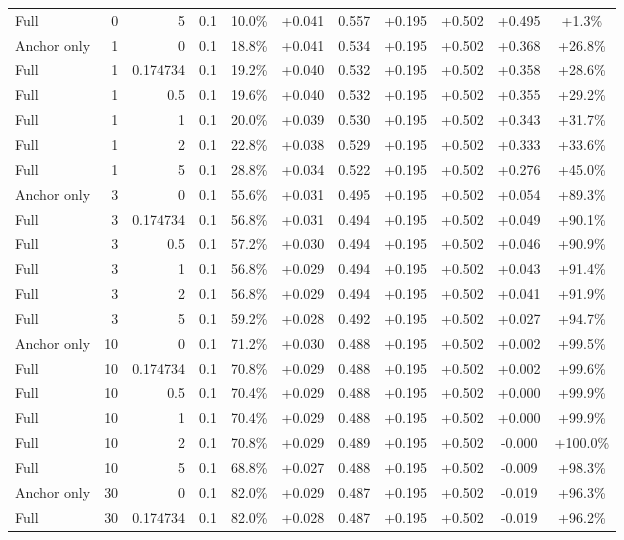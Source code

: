 \begin{table}[htbp]
\begin{tabular}{lrrrccccccc}
Full & 0 & 5 & 0.1 & 10.0\% & +0.041 & 0.557 & +0.195 & +0.502 & +0.495 & +1.3\% \\
Anchor only & 1 & 0 & 0.1 & 18.8\% & +0.041 & 0.534 & +0.195 & +0.502 & +0.368 & +26.8\% \\
Full & 1 & 0.174734 & 0.1 & 19.2\% & +0.040 & 0.532 & +0.195 & +0.502 & +0.358 & +28.6\% \\
Full & 1 & 0.5 & 0.1 & 19.6\% & +0.040 & 0.532 & +0.195 & +0.502 & +0.355 & +29.2\% \\
Full & 1 & 1 & 0.1 & 20.0\% & +0.039 & 0.530 & +0.195 & +0.502 & +0.343 & +31.7\% \\
Full & 1 & 2 & 0.1 & 22.8\% & +0.038 & 0.529 & +0.195 & +0.502 & +0.333 & +33.6\% \\
Full & 1 & 5 & 0.1 & 28.8\% & +0.034 & 0.522 & +0.195 & +0.502 & +0.276 & +45.0\% \\
Anchor only & 3 & 0 & 0.1 & 55.6\% & +0.031 & 0.495 & +0.195 & +0.502 & +0.054 & +89.3\% \\
Full & 3 & 0.174734 & 0.1 & 56.8\% & +0.031 & 0.494 & +0.195 & +0.502 & +0.049 & +90.1\% \\
Full & 3 & 0.5 & 0.1 & 57.2\% & +0.030 & 0.494 & +0.195 & +0.502 & +0.046 & +90.9\% \\
Full & 3 & 1 & 0.1 & 56.8\% & +0.029 & 0.494 & +0.195 & +0.502 & +0.043 & +91.4\% \\
Full & 3 & 2 & 0.1 & 56.8\% & +0.029 & 0.494 & +0.195 & +0.502 & +0.041 & +91.9\% \\
Full & 3 & 5 & 0.1 & 59.2\% & +0.028 & 0.492 & +0.195 & +0.502 & +0.027 & +94.7\% \\
Anchor only & 10 & 0 & 0.1 & 71.2\% & +0.030 & 0.488 & +0.195 & +0.502 & +0.002 & +99.5\% \\
Full & 10 & 0.174734 & 0.1 & 70.8\% & +0.029 & 0.488 & +0.195 & +0.502 & +0.002 & +99.6\% \\
Full & 10 & 0.5 & 0.1 & 70.4\% & +0.029 & 0.488 & +0.195 & +0.502 & +0.000 & +99.9\% \\
Full & 10 & 1 & 0.1 & 70.4\% & +0.029 & 0.488 & +0.195 & +0.502 & +0.000 & +99.9\% \\
Full & 10 & 2 & 0.1 & 70.8\% & +0.029 & 0.489 & +0.195 & +0.502 & -0.000 & +100.0\% \\
Full & 10 & 5 & 0.1 & 68.8\% & +0.027 & 0.488 & +0.195 & +0.502 & -0.009 & +98.3\% \\
Anchor only & 30 & 0 & 0.1 & 82.0\% & +0.029 & 0.487 & +0.195 & +0.502 & -0.019 & +96.3\% \\
Full & 30 & 0.174734 & 0.1 & 82.0\% & +0.028 & 0.487 & +0.195 & +0.502 & -0.019 & +96.2\% \\

\end{tabular}
\end{table}
